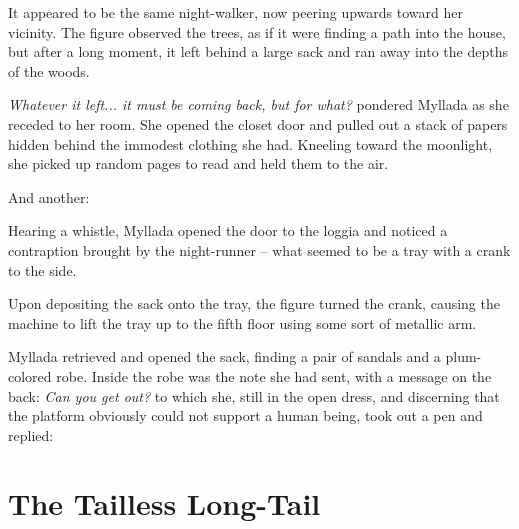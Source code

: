 It appeared to be the same night-walker, now peering upwards toward her vicinity. The figure observed the trees, as if it were finding a path into the house, but after a long moment, it left behind a large sack and ran away into the depths of the woods.

\emph{Whatever it left... it must be coming back, but for what?} pondered Myllada as she receded to her room. She opened the closet door and pulled out a stack of papers hidden behind the immodest clothing she had. Kneeling toward the moonlight, she picked up random pages to read and held them to the air.


And another:


Hearing a whistle, Myllada opened the door to the loggia and noticed a contraption brought by the night-runner -- what seemed to be a tray with a crank to the side.

Upon depositing the sack onto the tray, the figure turned the crank, causing the machine to lift the tray up to the fifth floor using some sort of metallic arm.

Myllada retrieved and opened the sack, finding a pair of sandals and a plum-colored robe. Inside the robe was the note she had sent, with a message on the back: \emph{Can you get out?} to which she, still in the open dress, and discerning that the platform obviously could not support a human being, took out a pen and replied:


\chapter{The Tailless Long-Tail}

